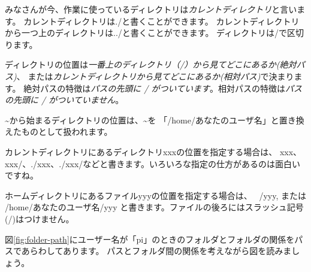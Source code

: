 みなさんが今、作業に使っているディレクトリは\emph{カレントディレクトリ}と言います。
カレントディレクトリは./と書くことができます。
カレントディレクトリから一つ上のディレクトリは../と書くことができます。
ディレクトリは/で区切ります。

ディレクトリの位置は\emph{一番上のディレクトリ（/）から見てどこにあるか(絶対パス)}、
または\emph{カレントディレクトリから見てどこにあるか(相対パス)}で決まります。
絶対パスの特徴は\emph{パスの先頭に / がついています}。相対パスの特徴は\emph{パスの先頭に / がついていません}。

\textasciitilde から始まるディレクトリの位置は、\textasciitilde を
「/home/あなたのユーザ名」と置き換えたものとして扱われます。

カレントディレクトリにあるディレクトリxxxの位置を指定する場合は、
xxx、xxx/、./xxx、./xxx/などと書きます。いろいろな指定の仕方があるのは面白いですね。

ホームディレクトリにあるファイルyyyの位置を指定する場合は、
~/yyy, または /home/あなたのユーザ名/yyy と書きます。ファイルの後ろにはスラッシュ記号(/)はつけません。

図\ref{fig:folder-path}にユーザー名が「pi」のときのフォルダとフォルダの関係をパスであらわしてあります。
パスとフォルダ間の関係を考えながら図を読みましょう。

